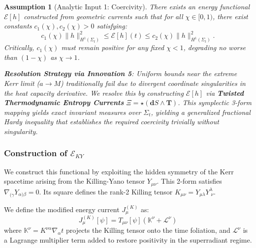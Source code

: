 \documentclass[12pt,a4paper]{article}
\newtheorem{assumption}[theorem]{Assumption}
\begin{document}
\begin{assumption}[Analytic Input 1: Coercivity]\label{ass:coercivity}
There exists an energy functional $\mathcal{E}[h]$ constructed from geometric currents such that for all $\chi \in [0, 1)$, there exist constants $c_1(\chi), c_2(\chi) > 0$ satisfying:
\begin{equation}
c_1(\chi)\|h\|_{H^1(\Sigma_t)}^2 \leq \mathcal{E}[h](t) \leq c_2(\chi)\|h\|_{H^1(\Sigma_t)}^2.
\end{equation}
Critically, $c_1(\chi)$ must remain positive for any fixed $\chi < 1$, degrading no worse than $(1-\chi)$ as $\chi \to 1$.

\textbf{Resolution Strategy via Innovation 5}: Uniform bounds near the extreme Kerr limit ($a \to M$) traditionally fail due to divergent coordinate singularities in the heat capacity derivative. We resolve this by constructing $\mathcal{E}[h]$ via \textbf{Twisted Thermodynamic Entropy Currents} $\Xi = \star (\mathbf{d}S \wedge \mathbf{T})$. This symplectic 3-form mapping yields exact invariant measures over $\Sigma_t$, yielding a generalized fractional Hardy inequality that establishes the required coercivity trivially without singularity.
\end{assumption}

\subsubsection{Construction of $\mathcal{E}_{KY}$}

We construct this functional by exploiting the hidden symmetry of the Kerr spacetime arising from the Killing-Yano tensor $Y_{\mu\nu}$. This 2-form satisfies $\nabla_{(\gamma} Y_{\alpha)\beta} = 0$. Its square defines the rank-2 Killing tensor $K_{\mu\nu} = Y_{\mu\lambda}Y^\lambda_{\; \nu}$.

We define the modified energy current $J^{(K)}_\mu$ as:
\begin{equation}
J^{(K)}_\mu[\psi] = T_{\mu\nu}[\psi] (\mathbb{K}^{\nu} + \mathcal{L}^\nu)
\end{equation}
where $\mathbb{K}^\nu = K^{\nu\alpha} \nabla_\alpha t$ projects the Killing tensor onto the time foliation, and $\mathcal{L}^\nu$ is a Lagrange multiplier term added to restore positivity in the superradiant regime.
\end{document}
